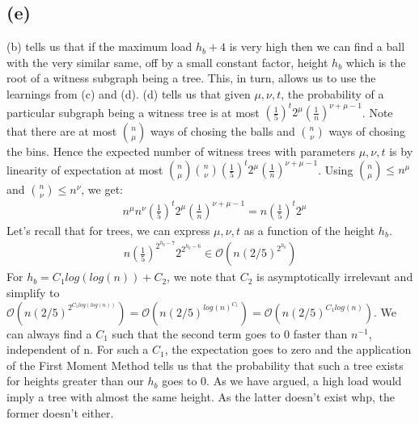 \documentclass[a4paper,german]{article}
\begin{document}
\subsection*{(e)}
	(b) tells us that if the maximum load \(h_b + 4\) is very high then we can find a ball with the very similar same, off by a small constant factor, height \(h_b\) which is the root of a witness subgraph being a tree. This, in turn, allows us to use the learnings from (c) and (d). (d) tells us that given \(\mu, \nu, t\), the probability of a particular subgraph being a witness tree is at most \((\frac{1}{5})^t 2^{\mu} (\frac{1}{n})^{\nu + \mu -1}\). Note that there are at most \({n \choose \mu}\) ways of chosing the balls and \({n \choose \nu}\) ways of chosing the bins. Hence the expected number of witness trees with parameters  \(\mu, \nu, t\) is by linearity of expectation at most \({n \choose \mu} {n \choose \nu}(\frac{1}{5})^t 2^{\mu} (\frac{1}{n})^{\nu + \mu -1}\). Using \({n \choose \mu} \leq n^{\mu}\) and \({n \choose \nu} \leq n^{\nu}\), we get:
	\begin{align*}
		&n^{\mu} n^{\nu}(\frac{1}{5})^t 2^{\mu} (\frac{1}{n})^{\nu + \mu -1} = n (\frac{1}{5})^t 2^{\mu}
	\end{align*}
	Let's recall that for trees, we can express \(\mu, \nu, t\) as a function of the height \(h_b\).
	\begin{align*}
		n (\frac{1}{5})^{2^{h_b - 7}} 2^{2^{h_b - 6}} \in \mathcal{O} (n (2/5)^{2^{h_b}})
	\end{align*}
	For \(h_b = C_1 log(log(n)) + C_2\), we note that \(C_2\) is asymptotically irrelevant and simplify to \(\mathcal{O} (n (2/5)^{2^{C_1 log(log(n))}}) = \mathcal{O} (n (2/5)^{log(n)^{C_1}}) = \mathcal{O} (n (2/5)^{C_1log(n)})\). We can always find a \(C_1\) such that the second term goes to 0 faster than \(n^{-1}\), independent of n. For such a \(C_1\), the expectation goes to zero and the application of the First Moment Method tells us that the probability that such a tree exists for heights greater than our \(h_b\) goes to 0. As we have argued, a high load would imply a tree with almost the same height. As the latter doesn't exist whp, the former doesn't either.
\end{document}
